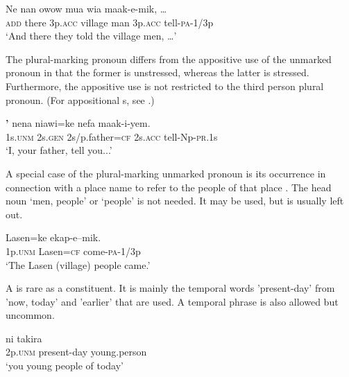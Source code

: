 \ea%
\label{ex:4:x1831}
\gll Ne  nan    owow  mua  wia  maak-e-mik,  {\dots} \\
  \textsc{add}  there  3p.\textsc{acc}  village  man  3p.\textsc{acc}  tell-\textsc{pa}-1/3p    \\
\glt`And there they told the village men, {\dots}'
\z

The plural-marking pronoun differs from the appositive use  of the unmarked pronoun in that the former is unstressed, whereas the latter is stressed. Furthermore, the appositive use is not restricted to the third person plural pronoun. (For appositional s, see .)

\ea%
\label{ex:4:x399}
\gll \textbf{'}  nena  niawi=ke  nefa  maak-i-yem. \\
    1s.\textsc{unm}  2s.\textsc{gen}  2s/p.father=\textsc{cf}  2s.\textsc{acc}  tell-Np-\textsc{pr}.1s  \\
\glt`I, your father, tell you...'
\z

A special case of the plural-marking unmarked pronoun is its occurrence in connection with a place name to refer to the people of that place .  The head noun  `men, people' or   `people' is not needed. It may be used, but is usually left out.

\ea%
\label{ex:4:x400}
\gll {}  Lasen=ke  ekap-e--mik. \\
  1p.\textsc{unm}  Lasen=\textsc{cf}  come-\textsc{pa}-1/3p    \\
\glt`The Lasen (village) people came.'
\z

A  is rare as a  constituent. It is mainly the temporal words   'present-day' from  'now, today'  and  'earlier'  that are used. A temporal phrase is also allowed but uncommon. 

\ea%
\label{ex:4:x401}
\gll ni    takira \\
  2p.\textsc{unm}  present-day  young.person    \\
\glt`you young people of today'
\z

